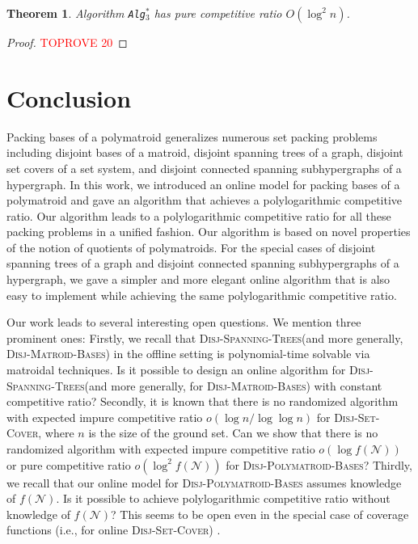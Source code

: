 \documentclass[11pt]{article}
\newtheorem{theorem}{Theorem}
\theoremstyle{definition}
\newcommand{\calN}{{\mathcal{N}}}
\newcommand{\DPB}{\textsc{Disj-Polymatroid-Bases}\xspace}
\newcommand{\DSC}{\textsc{Disj-Set-Cover}\xspace}
\newcommand{\DMB}{\textsc{Disj-Matroid-Bases}\xspace}
\newcommand{\DST}{\textsc{Disj-Spanning-Trees}\xspace}
\begin{document}
\begin{theorem}
    Algorithm \texttt{Alg$_3^*$} has pure competitive ratio $O(\log^2 n)$.
\end{theorem}
\begin{proof}\textcolor{red}{TOPROVE 20}\end{proof}


 \section{Conclusion}
Packing bases of a polymatroid generalizes numerous set packing problems including disjoint bases of a matroid, disjoint spanning trees of a graph, disjoint set covers of a set system, and disjoint connected spanning subhypergraphs of a hypergraph. In this work, we introduced an online model for packing bases of a polymatroid and gave an algorithm that achieves a polylogarithmic competitive ratio. Our algorithm leads to a polylogarithmic competitive ratio for all these packing problems in a unified fashion. Our algorithm is based on novel properties of the notion of quotients of polymatroids. For the special cases of disjoint spanning trees of a graph and disjoint connected spanning subhypergraphs of a hypergraph, we gave a simpler and more elegant online algorithm that is also easy to implement while achieving the same polylogarithmic competitive ratio. 

Our work leads to several interesting open questions. We mention three prominent ones: 
Firstly, we recall that \DST (and more generally, \DMB) in the offline setting is polynomial-time solvable via matroidal techniques. Is it possible to design an online algorithm for \DST (and more generally, for \DMB) with constant competitive ratio? 
Secondly, it is known that there is no randomized algorithm with expected impure competitive ratio $o(\log{n}/\log\log{n})$ for \DSC, where $n$ is the size of the ground set. Can we show that there is no randomized algorithm with expected impure competitive ratio $o(\log{f(\calN)})$ or pure competitive ratio $o(\log^2{f(\calN)})$ for \DPB? 
Thirdly, we recall that our online model for \DPB assumes knowledge of $f(\calN)$. Is it possible to achieve polylogarithmic competitive ratio without knowledge of $f(\calN)$? This seems to be open even in the special case of coverage functions (i.e., for online \DSC) \cite{EGK19}. 
\end{document}
